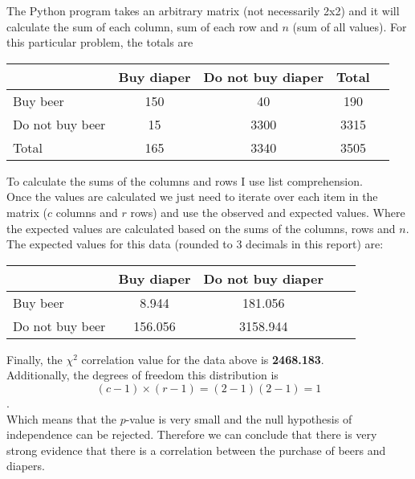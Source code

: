 \documentclass[11pt]{article}
\begin{document}
The Python program takes an arbitrary matrix (not necessarily 2x2) and it will calculate the sum of each column, sum of each row and $n$ (sum of all values). For this particular problem, the totals are

\begin{center}
\begin{tabular}{l*{3}{c}r}
                                     & Buy diaper & \multicolumn{1}{c|}{Do not buy diaper}  & Total\\
\hline
Buy beer                      & 150 & \multicolumn{1}{c|}{40}     & 190   \\
Do not buy beer          &   15 & \multicolumn{1}{c|}{3300} & 3315 \\
\hline
Total                             & 165& \multicolumn{1}{c|}{3340} & 3505 \\
\bottomrule
\end{tabular}
\end{center}

To calculate the sums of the columns and rows I use list comprehension.\\
Once the values are calculated we just need to iterate over each item in the matrix ($c$ columns and $r$ rows) and use the observed and expected values. Where the expected values are calculated based on the sums of the columns, rows and $n$.\\

The expected values for this data (rounded to 3 decimals in this report) are:
\begin{center}
\begin{tabular}{l*{3}{c}r}
                                     & Buy diaper & Do not buy diaper \\
\hline
Buy beer                      & 8.944 &    181.056  \\
Do not buy beer          & 156.056 & 3158.944 \\
\bottomrule
\end{tabular}
\end{center}

Finally, the $\chi^2$ correlation value for the data above is \textbf{2468.183}.\\

Additionally, the degrees of freedom this distribution is \[(c - 1)\times (r - 1) = (2 - 1)(2 - 1) = 1\].\\
Which means that the $p$-value is very small and the null hypothesis of independence can be rejected. Therefore we can conclude that there is very strong evidence that there is a correlation between the purchase of beers and diapers. 
\end{document}
